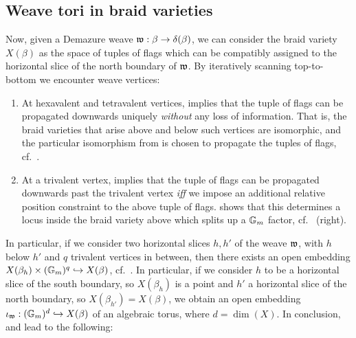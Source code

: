 \subsection{Weave tori in braid varieties}\label{ssec:weave_tori_braid_varieties} Now, given a Demazure weave $\mathfrak{w}:\beta\to\delta(\beta)$, we can consider the braid variety $X(\beta)$ as the space of tuples of flags which can be compatibly assigned to the horizontal slice of the north boundary of $\mathfrak{w}$. By iteratively scanning top-to-bottom we encounter weave vertices:
\begin{enumerate}
    \item At hexavalent and tetravalent vertices,  implies that the tuple of flags can be propagated downwards uniquely {\it without} any loss of information. That is, the braid varieties that arise above and below such vertices are isomorphic, and the particular isomorphism from  is chosen to propagate the tuples of flags, cf.~.\\

    \item At a trivalent vertex,  implies that the tuple of flags can be propagated downwards past the trivalent vertex {\it iff} we impose an additional relative position constraint to the above tuple of flags.  shows that this determines a locus inside the braid variety above which splits up a $\mathbb{G}_m$ factor, cf.~ (right).\\
\end{enumerate}

In particular, if we consider two horizontal slices $h,h'$ of the weave $\mathfrak{w}$, with $h$ below $h'$ and $q$ trivalent vertices in between, then there exists an open embedding $X(\beta_h)\times(\mathbb{G}_m)^q\hookrightarrow X(\beta)$, cf.~\cite[Section 5]{CGGJ24}. In particular, if we consider $h$ to be a horizontal slice of the south boundary, so $X(\beta_h)$ is a point and $h'$ a horizontal slice of the north boundary, so $X(\beta_{h'})=X(\beta)$, we obtain an open embedding $\iota_{\mathfrak{w}}:(\mathbb{G}_m)^d\hookrightarrow X(\beta)$ of an algebraic torus, where $d=\dim(X)$. In conclusion,  and  lead to the following:

